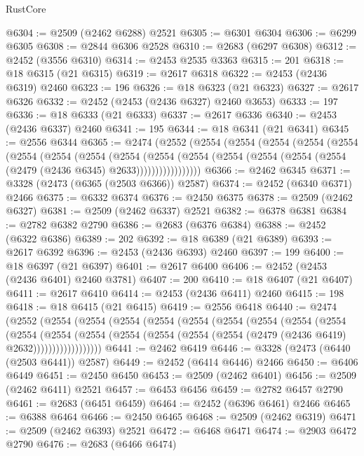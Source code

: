\begin{lexlean}{RustCore}
\begin{coremodule}
@6304 := @2509 (@2462 @6288) @2521
@6305 := @6301 @6304
@6306 := @6299 @6305
@6308 := @2844 @6306 @2528
@6310 := @2683 (@6297 @6308)
@6312 := @2452 (@3556 @6310)
@6314 := @2453 @2535 @3363
@6315 := 201
@6318 := @18 @6315 (@21 @6315)
@6319 := @2617 @6318
@6322 := @2453 (@2436 @6319) @2460
@6323 := 196
@6326 := @18 @6323 (@21 @6323)
@6327 := @2617 @6326
@6332 := @2452 (@2453 (@2436 @6327) @2460 @3653)
@6333 := 197
@6336 := @18 @6333 (@21 @6333)
@6337 := @2617 @6336
@6340 := @2453 (@2436 @6337) @2460
@6341 := 195
@6344 := @18 @6341 (@21 @6341)
@6345 := @2556 @6344
@6365 := @2474
    (@2552
      (@2554
        (@2554
          (@2554
            (@2554
              (@2554
                (@2554
                  (@2554
                    (@2554
                      (@2554
                        (@2554
                          (@2554
                            (@2554 (@2554 (@2554 (@2554 (@2479 (@2436 @6345) @2633)))))))))))))))))
@6366 := @2462 @6345
@6371 := @3328 (@2473 (@6365 (@2503 @6366)) @2587)
@6374 := @2452 (@6340 @6371) @2466
@6375 := @6332 @6374
@6376 := @2450 @6375
@6378 := @2509 (@2462 @6327)
@6381 := @2509 (@2462 @6337) @2521
@6382 := @6378 @6381
@6384 := @2782 @6382 @2790
@6386 := @2683 (@6376 @6384)
@6388 := @2452 (@6322 @6386)
@6389 := 202
@6392 := @18 @6389 (@21 @6389)
@6393 := @2617 @6392
@6396 := @2453 (@2436 @6393) @2460
@6397 := 199
@6400 := @18 @6397 (@21 @6397)
@6401 := @2617 @6400
@6406 := @2452 (@2453 (@2436 @6401) @2460 @3781)
@6407 := 200
@6410 := @18 @6407 (@21 @6407)
@6411 := @2617 @6410
@6414 := @2453 (@2436 @6411) @2460
@6415 := 198
@6418 := @18 @6415 (@21 @6415)
@6419 := @2556 @6418
@6440 := @2474
    (@2552
      (@2554
        (@2554
          (@2554
            (@2554
              (@2554
                (@2554
                  (@2554
                    (@2554
                      (@2554
                        (@2554
                          (@2554
                            (@2554
                              (@2554
                                (@2554 (@2554 (@2554 (@2479 (@2436 @6419) @2632))))))))))))))))))
@6441 := @2462 @6419
@6446 := @3328 (@2473 (@6440 (@2503 @6441)) @2587)
@6449 := @2452 (@6414 @6446) @2466
@6450 := @6406 @6449
@6451 := @2450 @6450
@6453 := @2509 (@2462 @6401)
@6456 := @2509 (@2462 @6411) @2521
@6457 := @6453 @6456
@6459 := @2782 @6457 @2790
@6461 := @2683 (@6451 @6459)
@6464 := @2452 (@6396 @6461) @2466
@6465 := @6388 @6464
@6466 := @2450 @6465
@6468 := @2509 (@2462 @6319)
@6471 := @2509 (@2462 @6393) @2521
@6472 := @6468 @6471
@6474 := @2903 @6472 @2790
@6476 := @2683 (@6466 @6474)

\end{coremodule}
\end{lexlean}
